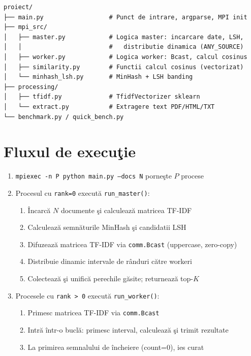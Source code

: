 \documentclass[a4paper,12pt]{report}
\begin{document}
\begin{verbatim}
proiect/
├── main.py                  # Punct de intrare, argparse, MPI init
├── mpi_src/
│   ├── master.py            # Logica master: incarcare date, LSH,
│   │                        #   distributie dinamica (ANY_SOURCE)
│   ├── worker.py            # Logica worker: Bcast, calcul cosinus
│   ├── similarity.py        # Functii calcul cosinus (vectorizat)
│   └── minhash_lsh.py       # MinHash + LSH banding
├── processing/
│   ├── tfidf.py             # TfidfVectorizer sklearn
│   └── extract.py           # Extragere text PDF/HTML/TXT
└── benchmark.py / quick_bench.py
\end{verbatim}

\section{Fluxul de execu\c{t}ie}

\begin{enumerate}
  \item \texttt{mpiexec -n P python main.py --docs N} porne\c{s}te $P$ procese
  \item Procesul cu \texttt{rank=0} execut\u{a} \texttt{run\_master()}:
  \begin{enumerate}
    \item \^{I}ncarc\u{a} $N$ documente \c{s}i calculeaz\u{a} matricea TF-IDF
    \item Calculeaz\u{a} semn\u{a}turile MinHash \c{s}i candidatii LSH
    \item Difuzeaz\u{a} matricea TF-IDF via \texttt{comm.Bcast} (uppercase, zero-copy)
    \item Distribuie dinamic intervale de r\^{a}nduri c\u{a}tre workeri
    \item Colecteaz\u{a} \c{s}i unific\u{a} perechile g\u{a}site; returneaz\u{a} top-$K$
  \end{enumerate}
  \item Procesele cu \texttt{rank > 0} execut\u{a} \texttt{run\_worker()}:
  \begin{enumerate}
    \item Primesc matricea TF-IDF via \texttt{comm.Bcast}
    \item Intr\u{a} \^{i}ntr-o bucl\u{a}: primesc interval, calculeaz\u{a} \c{s}i trimit rezultate
    \item La primirea semnalului de \^{i}ncheiere (count=0), ies curat
  \end{enumerate}
\end{enumerate}
\end{document}
